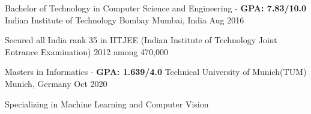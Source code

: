 
\begin{cventries}
  	
  	\cventry
    {Bachelor of Technology in Computer Science and Engineering - \textbf{GPA: 7.83/10.0}} %
    {Indian Institute of Technology Bombay} %
    {Mumbai, India} %
    {Aug 2016} %
    {
		\begin{cvitems}
			\item {Secured all India rank 35 in IITJEE (Indian Institute of Technology Joint Entrance Examination) 2012 among 470,000}
		\end{cvitems}
    }
	
	\cventry
	{Masters in Informatics - \textbf{GPA: 1.639/4.0}} %
	{Technical University of Munich(TUM)} %
	{Munich, Germany} %
	{Oct 2020} %
	{
		\begin{cvitems}
			\item {Specializing in Machine Learning and Computer Vision}
		\end{cvitems}
	}

\end{cventries}
